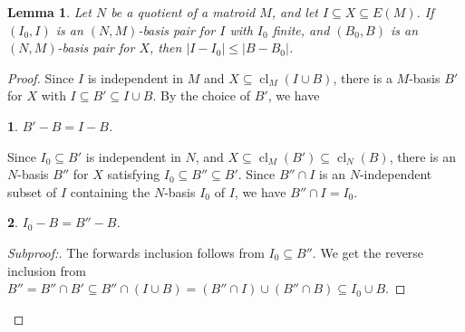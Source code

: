 \documentclass{amsart}
\theoremstyle{plain}
\newtheorem{claim}{}[theorem]
\newtheorem{lemma}[theorem]{Lemma}
\theoremstyle{definition}
\DeclareMathOperator{\cl}{cl}
\renewcommand{\le}{\leqslant}
\renewcommand{\ss}{\subseteq}
\newenvironment{subproof}[1][\proofname]{%
  \renewcommand{\qedsymbol}{$\blacksquare$}%
  \begin{proof}[Subproof:]%
}{%
  \end{proof}%
}
\begin{document}
\begin{lemma}\label{basispairtech}
  Let $N$ be a quotient of a matroid $M$, and let $I \ss X \ss E(M)$.
  If $(I_0,I)$ is an $(N,M)$-basis pair for $I$ with $I_0$ finite, and $(B_0,B)$ is an $(N,M)$-basis pair for $X$, 
  then $|I - I_0| \le |B - B_0|$. 
\end{lemma}
\begin{proof}
  Since $I$ is independent in $M$ and $X \ss \cl_M(I \cup B)$, there is a $M$-basis $B'$ for $X$ with $I \ss B' \ss I \cup B$. 
  By the choice of $B'$, we have 
  \begin{claim}\label{diffeq1}
    $B' - B = I - B$. 
  \end{claim}
  Since $I_0 \ss B'$ is independent in $N$, and $X \ss \cl_M(B') \ss \cl_N(B)$, there is an $N$-basis $B''$ for $X$
  satisfying $I_0 \ss B'' \ss B'$. 
  Since $B'' \cap I$ is an $N$-independent subset of $I$ containing the $N$-basis $I_0$ of $I$, we have $B'' \cap I = I_0$. 

  \begin{claim}
    $I_0 - B = B'' - B$. 
  \end{claim}
  \begin{subproof}
    The forwards inclusion follows from $I_0 \ss B''$. We get the reverse inclusion from 
    $B'' = B'' \cap B' \ss B'' \cap (I \cup B) = (B'' \cap I) \cup (B'' \cap B) \ss I_0 \cup B$. 
  \end{subproof}


\end{proof}
\end{document}
